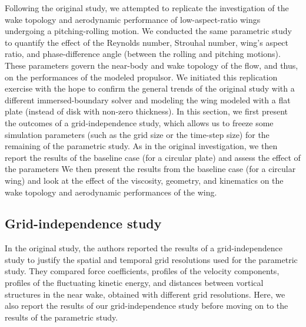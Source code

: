 Following the original study, we attempted to replicate the investigation of the wake topology and aerodynamic performance of low-aspect-ratio wings undergoing a pitching-rolling motion.
We conducted the same parametric study to quantify the effect of the Reynolds number, Strouhal number, wing's aspect ratio, and phase-difference angle (between the rolling and pitching motions).
These parameters govern the near-body and wake topology of the flow, and thus, on the performances of the modeled propulsor.
We initiated this replication exercise with the hope to confirm the general trends of the original study with a different immersed-boundary solver and modeling the wing modeled with a flat plate (instead of disk with non-zero thickness).
In this section, we first present the outcomes of a grid-independence study, which allows us to freeze some simulation parameters (such as the grid size or the time-step size) for the remaining of the parametric study.
As in the original investigation, we then report the results of the baseline case (for a circular plate) and assess the effect of the parameters
We then present the results from the baseline case (for a circular wing) and look at the effect of the viscosity, geometry, and kinematics on the wake topology and aerodynamic performances of the wing.

\subsection{Grid-independence study}

In the original study, the authors reported the results of a grid-independence study to justify the spatial and temporal grid resolutions used for the parametric study.
They compared force coefficients, profiles of the velocity components, profiles of the fluctuating kinetic energy, and distances between vortical structures in the near wake, obtained with different grid resolutions.
Here, we also report the results of our grid-independence study before moving on to the results of the parametric study.

